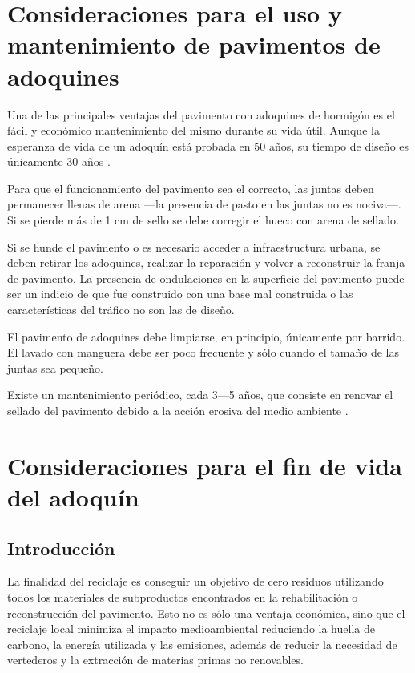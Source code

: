 \section{Consideraciones para el uso y mantenimiento de pavimentos de adoquines}\label{sec:consideracionesuso}

Una de las principales ventajas del pavimento con adoquines de hormigón es el fácil y económico mantenimiento del mismo durante su vida útil. Aunque la esperanza de vida de un adoquín está probada en 50 años, su tiempo de diseño es únicamente 30 años \cite{euroadoquin}.

Para que el funcionamiento del pavimento sea el correcto, las juntas deben permanecer llenas de arena —la presencia de pasto en las juntas no es nociva—. Si se pierde más de 1 \si{cm} de sello se debe corregir el hueco con arena de sellado.

Si se hunde el pavimento o es necesario acceder a infraestructura urbana, se deben retirar los adoquines, realizar la reparación y volver a reconstruir la franja de pavimento. La presencia de ondulaciones en la superficie del pavimento puede ser un indicio de que fue construido con una base mal construida o las características del tráfico no son las de diseño.

El pavimento de adoquines debe limpiarse, en principio, únicamente por barrido. El lavado con manguera debe ser poco frecuente y sólo cuando el tamaño de las juntas sea pequeño.

Existe un mantenimiento periódico, cada 3—5 años, que consiste en renovar el sellado del pavimento debido a la acción erosiva del medio ambiente \cite{malaka}.

\section{Consideraciones para el fin de vida del adoquín}\label{sec:consideracionesfindevida}

\subsection{Introducción}

La finalidad del reciclaje es conseguir un objetivo de cero residuos utilizando todos los materiales de subproductos encontrados en la rehabilitación o reconstrucción del pavimento. Esto no es sólo una ventaja económica, sino que el reciclaje local minimiza el impacto medioambiental reduciendo la huella de carbono, la energía utilizada y las emisiones, además de reducir la necesidad de vertederos y la extracción de materias primas no renovables.

